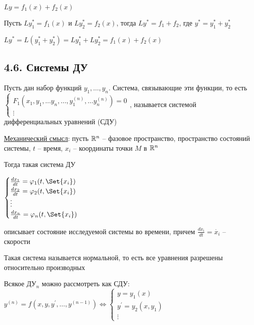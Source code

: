 \documentclass[12pt]{article}
\begin{document}
    \begin{MyTheorem}
        \Ths $Ly = f_1(x) + f_2(x)$

        Пусть $Ly_1^* = f_1(x)$ и $Ly^*_2 = f_2(x)$, тогда $Ly^* = f_1 + f_2$, где $y^* = y_1^* + y_2^*$
    \end{MyTheorem}

    \begin{MyProof}
        $Ly^* = L(y^*_1 + y^*_2) = Ly^*_1 + Ly^*_2 = f_1(x) + f_2(x)$
    \end{MyProof}

    \hypertarget{desystem}{}

    \subsection{4.6. Системы ДУ}

    \Def Пусть дан набор функций $y_1, \dots, y_n$. Система, связывающие эти функции, то есть
    $\begin{cases}
         F_1(x_1, y_1, \dots y_n, \dots, y_1^{(n)}, \dots y_n^{(n)}) = 0 \\
         \vdots
    \end{cases}$, называется системой дифференциальных уравнений (СДУ)

    \vspace{5mm}

    \underline{Механический смысл}: пусть $\mathbb{R}^n$ -- фазовое пространство, пространство состояний системы,
    $t$ -- время, $x_i$ -- координаты точки $M$ в $\mathbb{R}^n$

    Тогда такая система ДУ

    $\begin{cases}
         \frac{dx_1}{dt} = \varphi_1(t, \Set{x_i}) \\
         \frac{dx_2}{dt} = \varphi_2(t, \Set{x_i}) \\
         \vdots \\
         \frac{dx_n}{dt} = \varphi_n(t, \Set{x_i}) \\
    \end{cases}$
        
    описывает состояние исследуемой системы во времени, причем $\frac{dx_i}{dt} = \dot{x_i}$ -- скорости

    \Nota Такая система называется нормальной, то есть все уравнения разрешены относительно производных

    \Nota Всякое ДУ$_n$ можно рассмотреть как СДУ: $y^{(n)} = f(x, y, y^\prime, \dots, y^{(n - 1)}) \Longleftrightarrow \begin{cases}y = y_1(x) \\ y^\prime = y_2(x, y_1) \\ \vdots\end{cases}$
\end{document}
